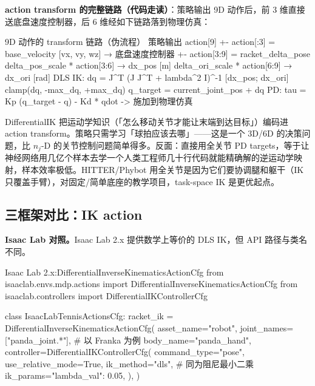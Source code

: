 \textbf{action transform 的完整链路（代码走读）}：策略输出 9D 动作后，前 3 维直接送底盘速度控制器，后 6 维经如下链路落到物理仿真：
\begin{codebox}[text]{9D 动作的 transform 链路（伪流程）}
策略输出 action[9]
  +- action[:3] = base_velocity [vx, vy, wz]  → 底盘速度控制器
  +- action[3:9] = racket_delta_pose
       delta_pos_scale * action[3:6] → dx_pos [m]
       delta_ori_scale * action[6:9] → dx_ori [rad]
       DLS IK: dq = J^T (J J^T + lambda^2 I)^{-1} [dx_pos; dx_ori]
       clamp(dq, -max_dq, +max_dq)
       q_target = current_joint_pos + dq
       PD: tau = Kp (q_target - q) - Kd * qdot   -> 施加到物理仿真
\end{codebox}

\begin{insight}\label{ins:rlmc-strike-taskspace}
DifferentialIK 把运动学知识（「怎么移动关节才能让末端到达目标」）编码进 action transform。策略只需学习「球拍应该去哪」——这是一个 3D/6D 的决策问题，比 $n_j$-D 的关节控制问题简单得多。反面：直接用全关节 PD targets，等于让神经网络用几亿个样本去学一个人类工程师几十行代码就能精确解的逆运动学映射，样本效率极低。HITTER/Phybot 用全关节是因为它们要协调腿和躯干（IK 只覆盖手臂），对固定/简单底座的教学项目，task-space IK 是更优起点。
\end{insight}

\subsection{三框架对比：IK action}

\textbf{Isaac Lab 对照。}Isaac Lab 2.x 提供数学上等价的 DLS IK，但 API 路径与类名不同。

\begin{codebox}[Python]{Isaac Lab 2.x:DifferentialInverseKinematicsActionCfg}
from isaaclab.envs.mdp.actions import DifferentialInverseKinematicsActionCfg
from isaaclab.controllers import DifferentialIKControllerCfg

class IsaacLabTennisActionsCfg:
    racket_ik = DifferentialInverseKinematicsActionCfg(
        asset_name="robot",
        joint_names=["panda_joint.*"],         # 以 Franka 为例
        body_name="panda_hand",
        controller=DifferentialIKControllerCfg(
            command_type="pose",
            use_relative_mode=True,
            ik_method="dls",                    # 同为阻尼最小二乘
            ik_params={"lambda_val": 0.05},
        ),
    )
\end{codebox}


